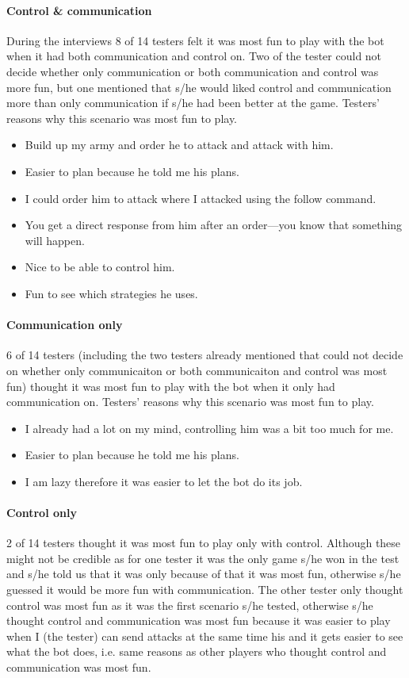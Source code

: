\paragraph{Control \& communication}
During the interviews 8 of 14 testers felt it was most fun to play with the bot when it had both communication and control on. Two of the tester could not decide whether only communication or both communication and control was more fun, but one mentioned that s/he would liked control and communication more than only communication if s/he had been better at the game. Testers' reasons why this scenario was most fun to play.
\begin{itemize}
	\item Build up my army and order he to attack and attack with him.
	\item Easier to plan because he told me his plans.
	\item I could order him to attack where I attacked using the follow command.
	\item You get a direct response from him after an order—you know that something will happen.
	\item Nice to be able to control him.
	\item Fun to see which strategies he uses.
\end{itemize}

\paragraph{Communication only}
6 of 14 testers (including the two testers already mentioned that could not decide on whether only communicaiton or both communicaiton and control was most fun) thought it was most fun to play with the bot when it only had communication on. Testers' reasons why this scenario was most fun to play.
\begin{itemize}
	\item I already had a lot on my mind, controlling him was a bit too much for me.	
	\item Easier to plan because he told me his plans.
	\item I am lazy therefore it was easier to let the bot do its job.
\end{itemize}

\paragraph{Control only}
2 of 14 testers thought it was most fun to play only with control. Although these might not be credible as for one tester it was the only game s/he won in the test and s/he told us that it was only because of that it was most fun, otherwise s/he guessed it would be more fun with communication. The other tester only thought control was most fun as it was the first scenario s/he tested, otherwise s/he thought control and communication was most fun because it was easier to play when I (the tester) can send attacks at the same time his and it gets easier to see what the bot does, i.e. same reasons as other players who thought control and communication was most fun.

